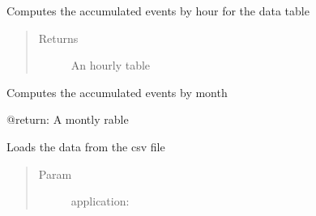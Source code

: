\documentclass[letterpaper,10pt,english]{sphinxmanual}
\begin{document}
\begin{fulllineitems}
\begin{fulllineitems}
\end{fulllineitems}


\begin{fulllineitems}
\label{index:SuperHub.Data.Data.hourly_table}
Computes the accumulated events by hour for the data table
\begin{quote}\begin{description}
\item[{Returns}] \leavevmode
An hourly table

\end{description}\end{quote}

\end{fulllineitems}


\begin{fulllineitems}
\label{index:SuperHub.Data.Data.lhh}
\end{fulllineitems}


\begin{fulllineitems}
\label{index:SuperHub.Data.Data.mnhh}
\end{fulllineitems}


\begin{fulllineitems}
\label{index:SuperHub.Data.Data.monthly_table}
Computes the accumulated events by month

@return: A montly rable

\end{fulllineitems}


\begin{fulllineitems}
\label{index:SuperHub.Data.Data.mxhh}
\end{fulllineitems}


\begin{fulllineitems}
\label{index:SuperHub.Data.Data.read_data}
Loads the data from the csv file
\begin{quote}\begin{description}
\item[{Param }] \leavevmode
application:


\end{description}
\end{quote}
\end{fulllineitems}
\end{fulllineitems}
\end{document}

